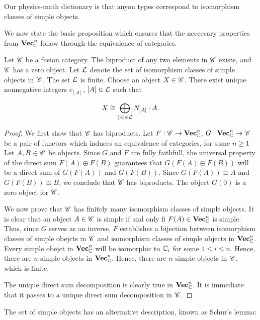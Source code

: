 Our physics-math dictionary is that anyon types correspond to isomorphism classes of simple objects.

We now state the basic proposition which ensures that the neccecary properties from $\mathbf{Vec}_{\mathbb{C}}^n$ follow through the equivalence of categories.

\begin{proposition} Let $\mathscr{C}$ be a fusion category. The biproduct of any two elements in $\mathscr{C}$ exists, and $\mathscr{C}$ has a zero object. Let $\mathcal{L}$ denote the set of isomorphism classes of simple objects in $\mathscr{C}$. The set $\mathcal{L}$ is finite. Choose an object $X\in \mathscr{C}$. There exist unique nonnegative integers $c_{[A]}$, $[A]\in \mathcal{L}$ such that 

$$X\cong \bigoplus_{[A]\in \mathcal{L}}N_{[A]}\cdot A.$$
\end{proposition}
\begin{proof} We first show that $\mathscr{C}$ has biproducts. Let $F:\mathscr{C}\to \mathbf{Vec}_{\mathbb{C}}^n$, $G:\mathbf{Vec}_{\mathbb{C}}^n\to \mathscr{C}$ be a pair of functors which induces an equivalence of categories, for some $n\geq 1$ Let $A,B\in \mathscr{C}$ be objects. Since $G$ and $F$ are fully faithfull, the universal property of the direct sum $F(A)\oplus F(B)$ guarantees that $G(F(A)\oplus F(B))$ will be a direct sum of $G(F(A))$ and $G(F(B))$. Since $G(F(A))\cong A$ and $G(F(B))\cong B$, we conclude that $\mathscr{C}$ has biproducts. The object $G(0)$ is a zero object for $\mathscr{C}$.

We now prove that $\mathscr{C}$ has finitely many isomorphism classes of simple objects. It is clear that an object $A\in \mathscr{C}$ is simple if and only fi $F(A)\in \mathbf{Vec}_{\mathbb{C}}^n$ is simple. Thus, since $G$ serves as an inverse, $F$ establishes a bijection between isomorphism classes of simple obejcts in $\mathscr{C}$ and isomorphism classes of simple objects in $\mathbf{Vec}_{\mathbb{C}}^n$. Every simple obejct in $\mathbf{Vec}_{\mathbb{C}}^n$ will be isomorphic to $\mathbb{C}_i$ for some $1\leq i \leq n$. Hence, there are $n$ simple objects in $\mathbf{Vec}_{\mathbb{C}}^n$. Hence, there are $n$ simple objects in $\mathscr{C}$, which is finite.

The unique direct sum decomposition is clearly true in $\mathbf{Vec}_{\mathbb{C}}^n$. It is immediate that it passes to a unique direct sum decomposition in $\mathscr{C}$.
\end{proof}

The set of simple objects has an alternative description, known as Schur's lemma:

